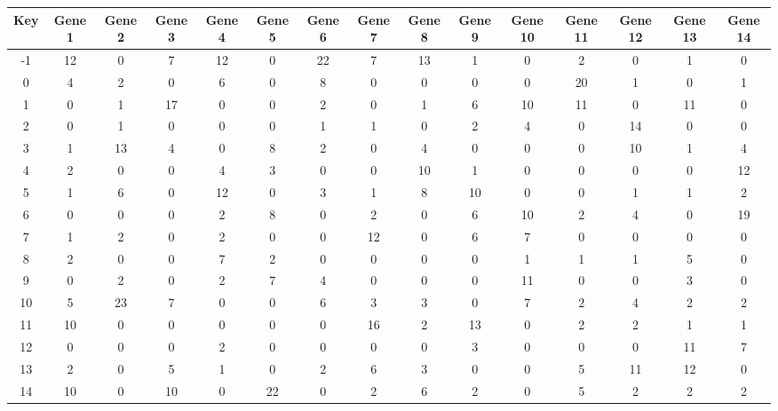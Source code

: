 \begin{tabular}{|c|c|c|c|c|c|c|c|c|c|c|c|c|c|c|}
\hline
Key & Gene 1 & Gene 2 & Gene 3 & Gene 4 & Gene 5 & Gene 6 & Gene 7 & Gene 8 & Gene 9 & Gene 10 & Gene 11 & Gene 12 & Gene 13 & Gene 14 \\
\hline
-1 & 12 & 0 & 7 & 12 & 0 & 22 & 7 & 13 & 1 & 0 & 2 & 0 & 1 & 0 \\
0 & 4 & 2 & 0 & 6 & 0 & 8 & 0 & 0 & 0 & 0 & 20 & 1 & 0 & 1 \\
1 & 0 & 1 & 17 & 0 & 0 & 2 & 0 & 1 & 6 & 10 & 11 & 0 & 11 & 0 \\
2 & 0 & 1 & 0 & 0 & 0 & 1 & 1 & 0 & 2 & 4 & 0 & 14 & 0 & 0 \\
3 & 1 & 13 & 4 & 0 & 8 & 2 & 0 & 4 & 0 & 0 & 0 & 10 & 1 & 4 \\
4 & 2 & 0 & 0 & 4 & 3 & 0 & 0 & 10 & 1 & 0 & 0 & 0 & 0 & 12 \\
5 & 1 & 6 & 0 & 12 & 0 & 3 & 1 & 8 & 10 & 0 & 0 & 1 & 1 & 2 \\
6 & 0 & 0 & 0 & 2 & 8 & 0 & 2 & 0 & 6 & 10 & 2 & 4 & 0 & 19 \\
7 & 1 & 2 & 0 & 2 & 0 & 0 & 12 & 0 & 6 & 7 & 0 & 0 & 0 & 0 \\
8 & 2 & 0 & 0 & 7 & 2 & 0 & 0 & 0 & 0 & 1 & 1 & 1 & 5 & 0 \\
9 & 0 & 2 & 0 & 2 & 7 & 4 & 0 & 0 & 0 & 11 & 0 & 0 & 3 & 0 \\
10 & 5 & 23 & 7 & 0 & 0 & 6 & 3 & 3 & 0 & 7 & 2 & 4 & 2 & 2 \\
11 & 10 & 0 & 0 & 0 & 0 & 0 & 16 & 2 & 13 & 0 & 2 & 2 & 1 & 1 \\
12 & 0 & 0 & 0 & 2 & 0 & 0 & 0 & 0 & 3 & 0 & 0 & 0 & 11 & 7 \\
13 & 2 & 0 & 5 & 1 & 0 & 2 & 6 & 3 & 0 & 0 & 5 & 11 & 12 & 0 \\
14 & 10 & 0 & 10 & 0 & 22 & 0 & 2 & 6 & 2 & 0 & 5 & 2 & 2 & 2 \\
\hline
\end{tabular}